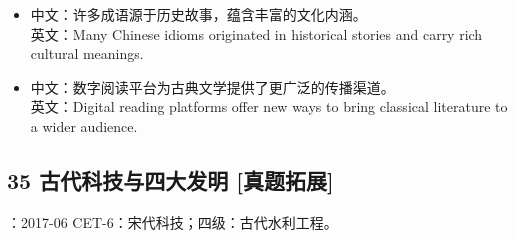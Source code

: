 \documentclass[a4paper,11pt,UTF8,fontset=none]{ctexart}
\begin{document}
\par

\begin{itemize}[leftmargin=1.7em,itemsep=1pt,parsep=0pt,topsep=2pt]
\item \noindent 中文：许多成语源于历史故事，蕴含丰富的文化内涵。\\ 英文：Many Chinese idioms originated in historical stories and carry rich cultural meanings.\par


\item \noindent 中文：数字阅读平台为古典文学提供了更广泛的传播渠道。\\ 英文：Digital reading platforms offer new ways to bring classical literature to a wider audience.\par


\end{itemize}

\subsection{35 古代科技与四大发明 {\color{AccentBlue} [真题拓展]}}

\begin{tcolorbox}[enhanced,breakable,boxrule=0.35pt,colback=VeryPaleBlue,colframe=AccentBlue!40,left=7pt,right=7pt,top=4pt,bottom=4pt,borderline west={2pt}{0pt}{AccentBlue},before skip=4pt,after skip=6pt]
：2017-06 CET-6：宋代科技；四级：古代水利工程。\par


\end{tcolorbox}
\end{document}
